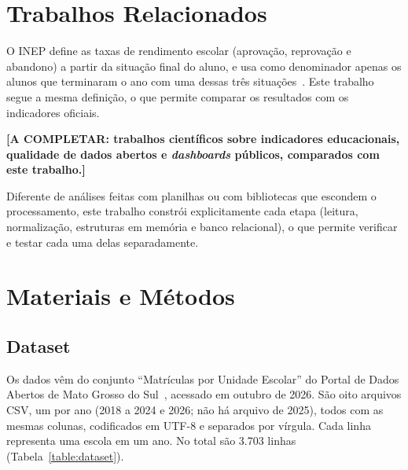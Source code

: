 \documentclass[preprint,10pt,5p]{elsarticle}
\begin{document}

\section{Trabalhos Relacionados}
\label{works}

O INEP define as taxas de rendimento escolar (aprovação, reprovação e abandono) a partir da situação final do aluno, e usa como denominador apenas os alunos que terminaram o ano com uma dessas três situações~\citep{inep2026rendimento}. Este trabalho segue a mesma definição, o que permite comparar os resultados com os indicadores oficiais.

\textbf{[A COMPLETAR: trabalhos científicos sobre indicadores educacionais, qualidade de dados abertos e \textit{dashboards} públicos, comparados com este trabalho.]}

Diferente de análises feitas com planilhas ou com bibliotecas que escondem o processamento, este trabalho constrói explicitamente cada etapa (leitura, normalização, estruturas em memória e banco relacional), o que permite verificar e testar cada uma delas separadamente.




\section{Materiais e Métodos}
\label{methods}

\subsection{Dataset}

Os dados vêm do conjunto ``Matrículas por Unidade Escolar'' do Portal de Dados Abertos de Mato Grosso do Sul~\citep{dadosms2026matriculas}, acessado em outubro de 2026. São oito arquivos CSV, um por ano (2018 a 2024 e 2026; não há arquivo de 2025), todos com as mesmas colunas, codificados em UTF-8 e separados por vírgula. Cada linha representa uma escola em um ano. No total são 3.703 linhas (Tabela~\ref{table:dataset}).
\end{document}
